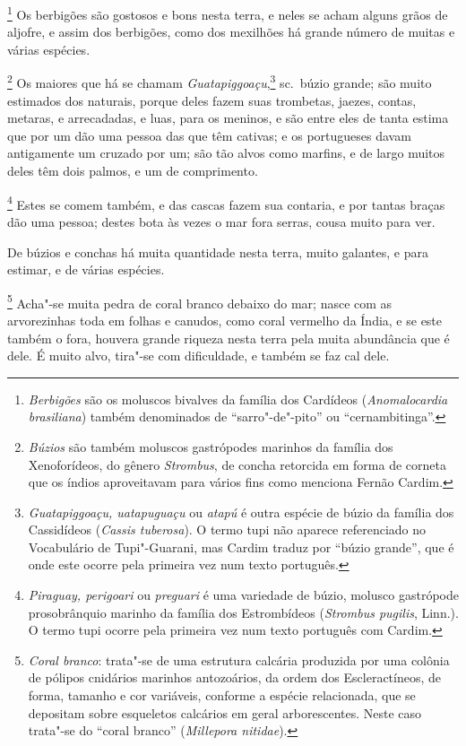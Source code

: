 \begin{linenumbers}
\footnote{ \textit{Berbigões} são os moluscos
bivalves da família dos Cardídeos (\textit{Anomalocardia brasiliana}) 
também denominados de ``sarro"-de"-pito'' ou ``cernambitinga''.} 
Os berbigões são gostosos e bons nesta terra, e neles se acham alguns
grãos de aljofre, e assim dos berbigões, como dos mexilhões há grande
número de muitas e várias espécies.

\footnote{ \textit{Búzios} são também moluscos
gastrópodes marinhos da família dos Xenoforídeos, do gênero
\textit{Strombus}, de concha retorcida em forma de corneta que os
índios aproveitavam para vários fins como menciona Fernão Cardim.} 
Os maiores que há se chamam \textit{Guatapiggoaçu},\footnote{ \textit{Guatapiggoaçu, uatapuguaçu} ou \textit{atapú} é
outra espécie de búzio da família dos Cassidídeos (\textit{Cassis
tuberosa}). O termo tupi não aparece referenciado no Vocabulário de
Tupi"-Guarani, mas Cardim traduz por ``búzio grande'', que é onde este
ocorre pela primeira vez num texto português.} sc.~búzio grande; são
muito estimados dos naturais, porque deles fazem suas trombetas,
jaezes, contas, metaras, e arrecadadas, e luas, para os meninos, e são
entre eles de tanta estima que por um dão uma pessoa das que têm
cativas; e os portugueses davam antigamente um cruzado por um; são tão
alvos como marfins, e de largo muitos deles têm dois palmos, e um de comprimento.

\footnote{ \textit{Piraguay, perigoari} ou
\textit{preguari} é uma variedade de búzio, molusco gastrópode
prosobrânquio marinho da família dos Estrombídeos (\textit{Strombus
pugilis}, Linn.). O termo tupi ocorre pela primeira vez num texto
português com Cardim.} Estes se comem também, e das cascas
fazem sua contaria, e por tantas braças dão uma pessoa; destes bota às
vezes o mar fora serras, cousa muito para ver. 

 De búzios e conchas há muita quantidade nesta terra, muito galantes, e
para estimar, e de várias espécies.

\footnote{ \textit{Coral branco}: trata"-se de
uma estrutura calcária produzida por uma colônia de pólipos cnidários
marinhos antozoários, da ordem dos Escleractíneos, de forma, tamanho e
cor variáveis, conforme a espécie relacionada, que se depositam sobre
esqueletos calcários em geral arborescentes. Neste caso trata"-se do
``coral branco'' (\textit{Millepora nitidae}).} Acha"-se muita
pedra de coral branco debaixo do mar; nasce com as arvorezinhas toda em
folhas e canudos, como coral vermelho da Índia, e se este também o
fora, houvera grande riqueza nesta terra pela muita abundância que é
dele. É muito alvo, tira"-se com dificuldade, e também se faz cal dele.


\end{linenumbers}
